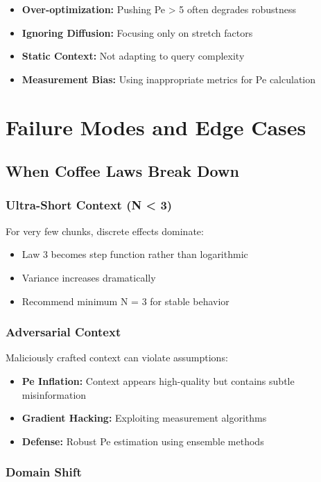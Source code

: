 \documentclass[conference]{IEEEtran}
\begin{document}
\begin{itemize}
\item \textbf{Over-optimization:} Pushing Pe > 5 often degrades robustness
\item \textbf{Ignoring Diffusion:} Focusing only on stretch factors
\item \textbf{Static Context:} Not adapting to query complexity
\item \textbf{Measurement Bias:} Using inappropriate metrics for Pe calculation
\end{itemize}

\section{Failure Modes and Edge Cases}

\subsection{When Coffee Laws Break Down}

\subsubsection{Ultra-Short Context (N < 3)}

For very few chunks, discrete effects dominate:
\begin{itemize}
\item Law 3 becomes step function rather than logarithmic
\item Variance increases dramatically
\item Recommend minimum N = 3 for stable behavior
\end{itemize}

\subsubsection{Adversarial Context}

Maliciously crafted context can violate assumptions:
\begin{itemize}
\item \textbf{Pe Inflation:} Context appears high-quality but contains subtle misinformation
\item \textbf{Gradient Hacking:} Exploiting measurement algorithms
\item \textbf{Defense:} Robust Pe estimation using ensemble methods
\end{itemize}

\subsubsection{Domain Shift}
\end{document}
